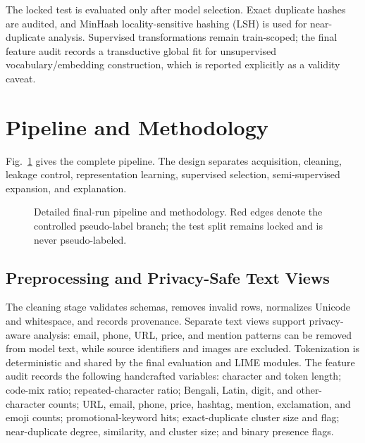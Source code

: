 \documentclass[conference]{IEEEtran}
\begin{document}
The locked test is evaluated only after model selection. Exact duplicate hashes are audited, and MinHash locality-sensitive hashing (LSH) is used for near-duplicate analysis. Supervised transformations remain train-scoped; the final feature audit records a transductive global fit for unsupervised vocabulary/embedding construction, which is reported explicitly as a validity caveat.

\section{Pipeline and Methodology}
Fig.~\ref{fig:pipeline} gives the complete pipeline. The design separates acquisition, cleaning, leakage control, representation learning, supervised selection, semi-supervised expansion, and explanation.

\begin{figure}[t]
\centering
\resizebox{\textwidth}{!}{}
\caption{Detailed final-run pipeline and methodology. Red edges denote the controlled pseudo-label branch; the test split remains locked and is never pseudo-labeled.}
\label{fig:pipeline}
\end{figure}

\subsection{Preprocessing and Privacy-Safe Text Views}
The cleaning stage validates schemas, removes invalid rows, normalizes Unicode and whitespace, and records provenance. Separate text views support privacy-aware analysis: email, phone, URL, price, and mention patterns can be removed from model text, while source identifiers and images are excluded. Tokenization is deterministic and shared by the final evaluation and LIME modules. The feature audit records the following handcrafted variables: character and token length; code-mix ratio; repeated-character ratio; Bengali, Latin, digit, and other-character counts; URL, email, phone, price, hashtag, mention, exclamation, and emoji counts; promotional-keyword hits; exact-duplicate cluster size and flag; near-duplicate degree, similarity, and cluster size; and binary presence flags.
\end{document}
